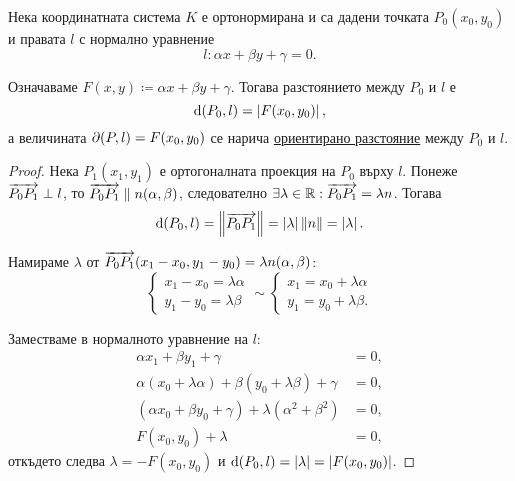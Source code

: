 \documentclass[numbers=endperiod, DIV=15, bibliography=totocnumbered]{scrartcl}
\begin{document}
\begin{theorem}\label{thm:plane-dist}
  Нека координатната система $K$ е ортонормирана и са дадени точката $P_0(x_0, y_0)$ и правата $l$ с нормално уравнение
  \begin{displaymath}
    l: \alpha x + \beta y + \gamma = 0.
  \end{displaymath}

  Означаваме $F(x, y) \coloneqq \alpha x + \beta y + \gamma$. Тогава разстоянието между $P_0$ и $l$ е
  \begin{displaymath}
    \operatorname{d}(P_0, l) = \left\vert F(x_0, y_0) \right\vert,
  \end{displaymath}
  а величината $\partial(P, l) = F(x_0, y_0)$ се нарича \uline{ориентирано разстояние} между $P_0$ и $l$.
\end{theorem}
\begin{proof}
  Нека $P_1(x_1, y_1)$ е ортогоналната проекция на $P_0$ върху $l$. Понеже $\overrightarrow{P_0 P_1} \perp l$, то $\overrightarrow{P_0 P_1} \parallel n(\alpha, \beta)$, следователно $\exists \lambda \in \mathbb{R}: \overrightarrow{P_0 P_1} = \lambda n$. Тогава
  \begin{displaymath}
    \operatorname{d}(P_0, l)
    =
    \left\Vert \overrightarrow{P_0 P_1} \right\Vert
    =
    \left\vert \lambda \right\vert \left\Vert n \right\Vert
    =
    \left\vert \lambda \right\vert.
  \end{displaymath}

  Намираме $\lambda$ от $\overrightarrow{P_0 P_1}(x_1 - x_0, y_1 - y_0) = \lambda n(\alpha, \beta)$:
  \begin{displaymath}
    \begin{cases}
      x_1 - x_0 = \lambda \alpha \\
      y_1 - y_0 = \lambda \beta
    \end{cases}
    \sim
    \begin{cases}
      x_1 = x_0 + \lambda \alpha \\
      y_1 = y_0 + \lambda \beta.
    \end{cases}
  \end{displaymath}

  Заместваме в нормалното уравнение на $l$:
  \begin{align*}
    \alpha x_1 + \beta y_1 + \gamma &= 0,
    \\
    \alpha (x_0 + \lambda \alpha) + \beta (y_0 + \lambda \beta) + \gamma &= 0,
    \\
    (\alpha x_0 + \beta y_0 + \gamma) + \lambda(\alpha^2 + \beta^2) &= 0,
    \\
    F(x_0, y_0) + \lambda &= 0,
  \end{align*}
  откъдето следва $\lambda = -F(x_0, y_0)$ и $\operatorname{d}(P_0, l) = \left\vert \lambda \right\vert = \left\vert F(x_0, y_0) \right\vert$.
\end{proof}
\end{document}
